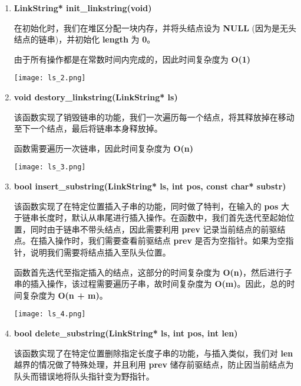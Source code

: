             \begin{enumerate}
                \item \textbf{LinkString* init\_linkstring(void)}
                    \par 在初始化时，我们在堆区分配一块内存，并将头结点设为 \textbf{NULL} (因为是无头结点的链串)，并初始化 \textbf{length} 为 \textbf{0}。
                    \par 由于所有操作都是在常数时间内完成的，因此时间复杂度为 \textbf{O(1)}
                    \begin{figure*}[htbp]
                        \texttt{[image: ls\_2.png]}
                    \end{figure*}
                \item \textbf{void destory\_linkstring(LinkString* ls)}
                    \par 该函数实现了销毁链串的功能，我们一次遍历每一个结点，将其释放掉在移动至下一个结点，最后将链串本身释放掉。
                    \par 函数需要遍历一次链串，因此时间复杂度为 \textbf{O(n)}
                    \begin{figure*}[htbp]
                        \texttt{[image: ls\_3.png]}
                    \end{figure*}
                \item \textbf{bool insert\_substring(LinkString* ls, int pos, const char* substr)}
                    \par 该函数实现了在特定位置插入子串的功能，同时做了特判，在输入的 \textbf{pos} 大于链串长度时，默认从串尾进行插入操作。在函数中，我们首先迭代至起始位置，同时由于链串不带头结点，因此需要利用 \textbf{prev} 记录当前结点的前驱结点。在插入操作时，我们需要查看前驱结点 \textbf{prev} 是否为空指针。如果为空指针，说明我们需要将结点插入至队头位置。
                    \par 函数首先迭代至指定插入的结点，这部分的时间复杂度为 \textbf{O(n)}，然后进行子串的插入操作，该过程需要遍历子串，故时间复杂度为 \textbf{O(m)}。因此，总的时间复杂度为 \textbf{O(n + m)}。
                    \begin{figure*}[htbp]
                        \texttt{[image: ls\_4.png]}
                    \end{figure*}
                \newpage
                \item \textbf{bool delete\_substring(LinkString* ls, int pos, int len)}
                    \par 该函数实现了在特定位置删除指定长度子串的功能，与插入类似，我们对 \textbf{len} 越界的情况做了特殊处理，并且利用 \textbf{prev} 储存前驱结点，防止因当前结点为队头而错误地将队头指针变为野指针。

\end{enumerate}
